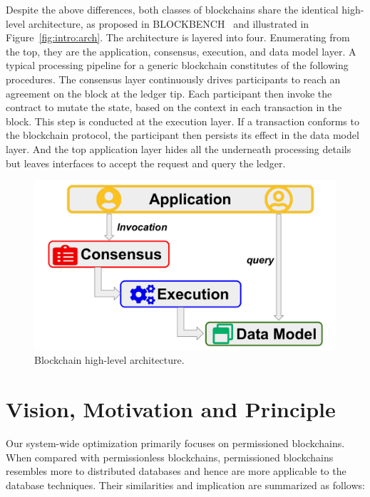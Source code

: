 Despite the above differences, both classes of blockchains share the identical high-level architecture, as proposed in BLOCKBENCH~\cite{dinh2017blockbench} and illustrated in Figure~\ref{fig:intro:arch}. 
The architecture is layered into four. Enumerating from the top, they are the application, consensus, execution, and data model layer. 
A typical processing pipeline for a generic blockchain constitutes of the following procedures. 
The consensus layer continuously drives participants to reach an agreement on the block at the ledger tip. 
Each participant then invoke the contract to mutate the state, based on the context in each transaction in the block. 
This step is conducted at the execution layer.
If a transaction conforms to the blockchain protocol, the participant then persists its effect in the data model layer. 
And the top application layer hides all the underneath processing details but leaves interfaces to accept the request and query the ledger. 

\begin{figure}[!t]
  \centering
  \includegraphics[width=0.8\linewidth]{diagram/intro/architecture.pdf}
  \vspace{\BeforeCaptionVSpace}
  \caption{Blockchain high-level architecture. }
  \label{diagram:intro:arch}
\end{figure}

\section{Vision, Motivation and Principle}

Our system-wide optimization primarily focuses on permissioned blockchains.
When compared with permissionless blockchains, permissioned blockchains resembles more to distributed databases and hence are more applicable to the database techniques.  
Their similarities and implication are summarized as follows: 

